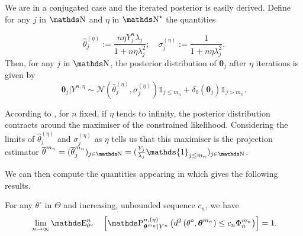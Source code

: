 We are in a conjugated case and the iterated posterior is easily derived.
Define for any $j$ in $\N$ and $\eta$ in $\N^{\star}$ the quantities

\[\widehat{\theta}^{(\eta)}_{j} := \frac{n \eta Y^{n}_{j} \lambda_{j}}{1 + n \eta \lambda_{j}^{2}}; \quad \sigma^{(\eta)}_{j} := \frac{1}{1 + n \eta \lambda_{j}^{2}}.\]
Then, for any $j$ in $\N$, the posterior distribution of $\boldsymbol{\theta}_{j}$ after $\eta$ iterations is given by
\[\boldsymbol{\theta}_{j} \vert Y^{n, \eta} \sim \mathcal{N}(\widehat{\theta}^{(\eta)}_{j}, \sigma^{(\eta)}_{j}) \mathds{1}_{j \leq m_{n}} + \delta_{0}(\boldsymbol{\theta}_{j}) \mathds{1}_{j > m_{n}}.\]

According to , for $n$ fixed, if $\eta$ tends to infinity, the posterior distribution contracts around the maximiser of the constrained likelihood.
Considering the limits of $\widehat{\theta}^{(\eta)}_{j}$ and $\sigma^{(\eta)}_{j}$ as $\eta$ tells us that this maximiser is the projection estimator $\overline{\theta}^{m_{n}} = (\overline{\theta}^{m_{n}}_{j})_{j \in \N} = (\frac{Y_{j}}{\lambda_{j}} \mathds{1}_{j \leq m_{n}})_{j \in \N}$.

\medskip

We can then compute the quantities appearing in  which gives the following results.

\begin{cor}\label{cor2.4.1}
For any $\theta^{\circ}$ in $\Theta$ and increasing, unbounded sequence $c_{n}$, we have
\begin{alignat*}{3}
& && \lim\limits_{n \rightarrow \infty} \E_{\theta^{\circ}}^{n}&&\left[\P_{\boldsymbol{\theta}^{m_{n}}\vert Y^{n}}^{n, (\eta)}\left(d^{2}\left(\theta^{\circ}, \boldsymbol{\theta}^{m_{n}}\right) \leq c_{n} \Phi^{m_{n}}_{n} \right)\right] = 1.
\end{alignat*}
\end{cor}

